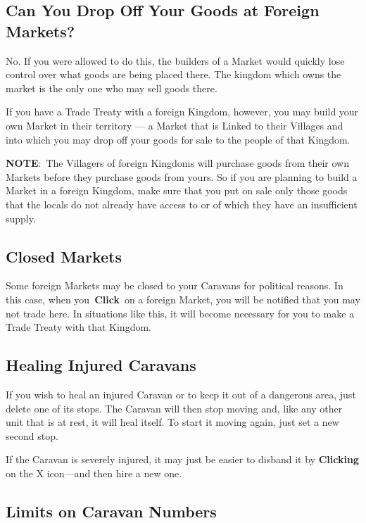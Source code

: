 \subsection{Can You Drop Off Your Goods at Foreign Markets?}

No. If you were allowed to do this, the builders of a Market would quickly lose control over what goods are being placed there. The kingdom which owns the market is the only one who may sell goods there.

If you have a Trade Treaty with a foreign Kingdom, however, you may build your own Market in their territory --- a Market that is Linked to their Villages and into which you may drop off your goods for sale to the people of that Kingdom.

\textbf{NOTE}: The Villagers of foreign Kingdoms will purchase goods from their own Markets before they purchase goods from yours. So if you are planning to build a Market in a foreign Kingdom, make sure that you put on sale only those goods that the locals do not already have access to or of which they have an insufficient supply.

\subsection{Closed Markets}

Some foreign Markets may be closed to your Caravans for political reasons. In this case, when you \textbf{Click} on a foreign Market, you will be notified that you may not trade here. In situations like this, it will become necessary for you to make a Trade Treaty with that Kingdom.

\subsection{Healing Injured Caravans}


If you wish to heal an injured Caravan or to keep it out of a dangerous area, just delete one of its stops. The Caravan will then stop moving and, like any other unit that is at rest, it will heal itself. To start it moving again, just set a new second stop.

If the Caravan is severely injured, it may just be easier to disband it by \textbf{Clicking} on the X icon---and then hire a new one.

\subsection{Limits on Caravan Numbers}

